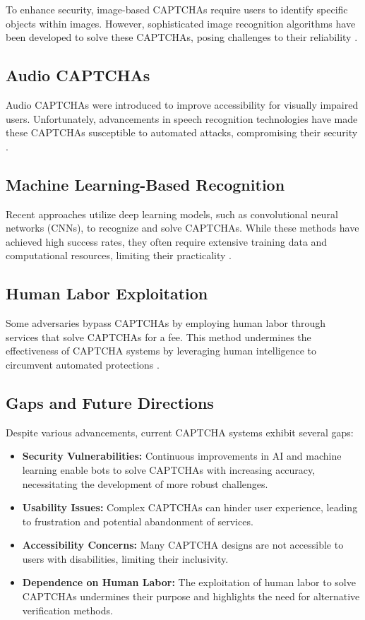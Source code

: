 \documentclass[sigconf]{acmart}
\begin{document}
To enhance security, image-based CAPTCHAs require users to identify specific objects within images. However, sophisticated image recognition algorithms have been developed to solve these CAPTCHAs, posing challenges to their reliability \cite{guerar2021survey}.

\subsection{Audio CAPTCHAs}

Audio CAPTCHAs were introduced to improve accessibility for visually impaired users. Unfortunately, advancements in speech recognition technologies have made these CAPTCHAs susceptible to automated attacks, compromising their security \cite{hypersecure2023limitations}.

\subsection{Machine Learning-Based Recognition}

Recent approaches utilize deep learning models, such as convolutional neural networks (CNNs), to recognize and solve CAPTCHAs. While these methods have achieved high success rates, they often require extensive training data and computational resources, limiting their practicality \cite{wang2021deep}.

\subsection{Human Labor Exploitation}

Some adversaries bypass CAPTCHAs by employing human labor through services that solve CAPTCHAs for a fee. This method undermines the effectiveness of CAPTCHA systems by leveraging human intelligence to circumvent automated protections \cite{wikipedia2023captcha}.

\subsection{Gaps and Future Directions}

Despite various advancements, current CAPTCHA systems exhibit several gaps:

\begin{itemize}
    \item \textbf{Security Vulnerabilities:} Continuous improvements in AI and machine learning enable bots to solve CAPTCHAs with increasing accuracy, necessitating the development of more robust challenges.
    \item \textbf{Usability Issues:} Complex CAPTCHAs can hinder user experience, leading to frustration and potential abandonment of services.
    \item \textbf{Accessibility Concerns:} Many CAPTCHA designs are not accessible to users with disabilities, limiting their inclusivity.
    \item \textbf{Dependence on Human Labor:} The exploitation of human labor to solve CAPTCHAs undermines their purpose and highlights the need for alternative verification methods.
\end{itemize}
\end{document}
